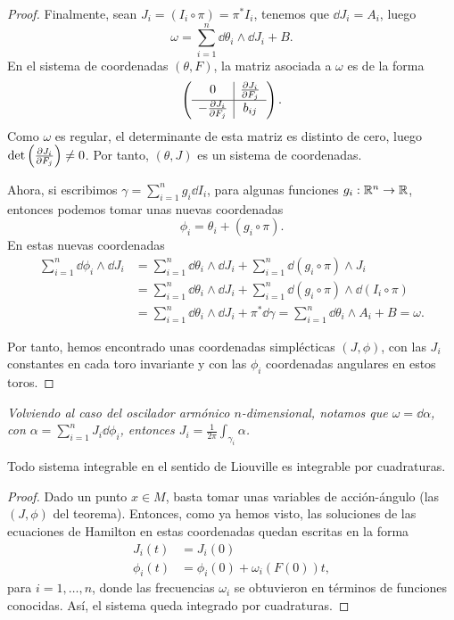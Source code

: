 \begin{proof}
Finalmente, sean $J_i=(I_i \circ \pi)=\pi^* I_i$, tenemos que $\dd J_i = A_i$, luego
\[
  \omega = \sum_{i=1}^n \dd \theta_i \wedge \dd J_i + B.
\]
En el sistema de coordenadas $(\theta,F)$, la matriz asociada a $\omega$ es de la forma
\[
\left(
\begin{array}{c|c}
  0 & \frac{\partial J_i}{\partial F_j} \\
  \hline 
  -\frac{\partial J_i}{\partial F_j} & b_{ij}
\end{array}\right).
\]
Como $\omega$ es regular, el determinante de esta matriz es distinto de cero, luego $\det\left(\frac{\partial J_i}{\partial F_j}\right)\neq 0$. Por tanto, $(\theta,J)$ es un sistema de coordenadas.

Ahora, si escribimos $\gamma= \sum_{i=1}^n g_i \dd I_i$, para algunas funciones $g_i:\mathbb{R}^n \rightarrow \mathbb{R}$, entonces podemos tomar unas nuevas coordenadas 
\[
  \phi_i= \theta_i + (g_i \circ \pi).
\]
En estas nuevas coordenadas
\[
\begin{split}
  \sum_{i=1}^n \dd \phi_i \wedge \dd J_i & = \sum_{i=1}^n \dd \theta_i \wedge \dd J_i + \sum_{i=1}^n \dd(g_i \circ \pi) \wedge J_i \\
   & =\sum_{i=1}^n \dd \theta_i \wedge \dd J_i + \sum_{i=1}^n \dd(g_i \circ \pi) \wedge \dd (I_i \circ \pi) \\
   & =\sum_{i=1}^n \dd \theta_i \wedge \dd J_i + \pi^* \dd \gamma = \sum_{i=1}^n \dd \theta_i \wedge A_i + B = \omega.
\end{split}
\]

Por tanto, hemos encontrado unas coordenadas simplécticas $(J,\phi)$, con las $J_i$ constantes en cada toro invariante y con las $\phi_i$ coordenadas angulares en estos toros.
\end{proof}

\begin{obs}
  \em
  Volviendo al caso del oscilador armónico $n$-dimensional, notamos que $\omega=\dd \alpha$, con $\alpha=\sum_{i=1}^n J_i \dd \phi_i$, entonces $J_i=\frac{1}{2\pi}\int_{\gamma_i}\alpha$.
\end{obs}

\begin{corol}
  Todo sistema integrable en el sentido de Liouville es integrable por cuadraturas.
\end{corol}

\begin{proof}
  Dado un punto $x \in M$, basta tomar unas variables de acción-ángulo (las $(J,\phi)$ del teorema). Entonces, como ya hemos visto, las soluciones de las ecuaciones de Hamilton en estas coordenadas quedan escritas en la forma
  \begin{align*}
    J_i(t) & = J_i (0) \\
    \phi_i(t) & = \phi_i(0) + \omega_i(F(0))t,
  \end{align*}
  para $i=1,\dots,n$, donde las frecuencias $\omega_i$ se obtuvieron en términos de funciones conocidas. Así, el sistema queda integrado por cuadraturas.
\end{proof}


